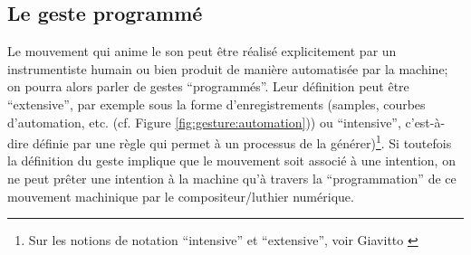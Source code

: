 \subsection{Le geste programmé}
\label{sec:gesture:instrumental_to_musical:geste_programme}

\noindent Le mouvement qui anime le son peut être réalisé explicitement par un instrumentiste humain ou bien produit de manière automatisée par la machine; on pourra alors parler de gestes ``programmés''. Leur définition peut être ``extensive'', par exemple sous la forme d'enregistrements (samples, courbes d'automation, etc. (cf. Figure \ref{fig:gesture:automation})) ou ``intensive'', c'est-à-dire définie par une règle qui permet à un processus de la générer)\footnote{Sur les notions de notation ``intensive'' et ``extensive'', voir Giavitto \cite{giavitto_du_2014}}. Si toutefois la définition du geste implique que le mouvement soit associé à une intention, on ne peut prêter une intention à la machine qu'à travers la ``programmation'' de ce mouvement machinique par le compositeur/luthier numérique.\\
